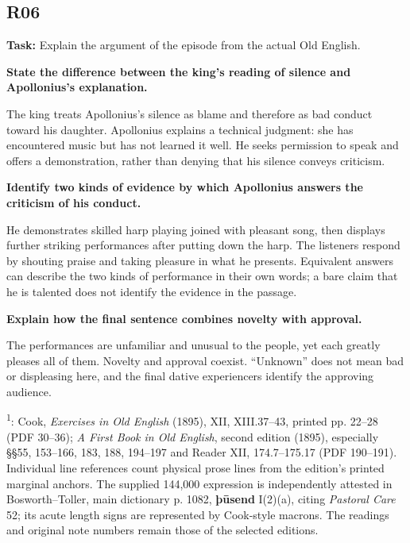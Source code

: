 \subsection*{R06}

\textbf{Task:} Explain the argument of the episode from the actual Old English.

\textbf{State the difference between the king’s reading of silence and Apollonius’s explanation.}

The king treats Apollonius's silence as blame and therefore as bad conduct toward his daughter. Apollonius explains a technical judgment: she has encountered music but has not learned it well. He seeks permission to speak and offers a demonstration, rather than denying that his silence conveys criticism.

\textbf{Identify two kinds of evidence by which Apollonius answers the criticism of his conduct.}

He demonstrates skilled harp playing joined with pleasant song, then displays further striking performances after putting down the harp. The listeners respond by shouting praise and taking pleasure in what he presents. Equivalent answers can describe the two kinds of performance in their own words; a bare claim that he is talented does not identify the evidence in the passage.

\textbf{Explain how the final sentence combines novelty with approval.}

The performances are unfamiliar and unusual to the people, yet each greatly pleases all of them. Novelty and approval coexist. “Unknown” does not mean bad or displeasing here, and the final dative experiencers identify the approving audience.

\textsuperscript{1}: Cook, \emph{Exercises in Old English} (1895), XII, XIII.37–43, printed pp. 22–28 (PDF 30–36); \emph{A First Book in Old English}, second edition (1895), especially §§55, 153–166, 183, 188, 194–197 and Reader XII, 174.7–175.17 (PDF 190–191). Individual line references count physical prose lines from the edition's printed marginal anchors. The supplied 144,000 expression is independently attested in Bosworth–Toller, main dictionary p. 1082, \textbf{þūsend} I(2)(a), citing \emph{Pastoral Care} 52; its acute length signs are represented by Cook-style macrons. The readings and original note numbers remain those of the selected editions.


